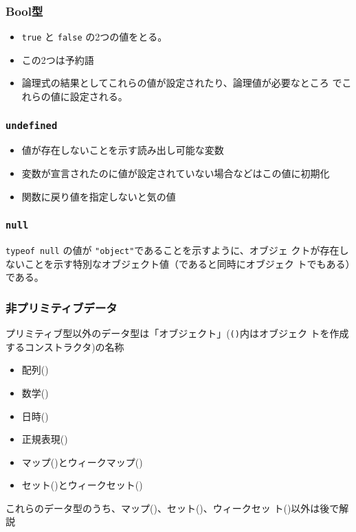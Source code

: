 \begin{frame}[containsverbatim]
 \frametitle{Bool型}
 \begin{itemize}
  \item \Verb+true+ と \Verb+false+ の2つの値をとる。
  \item この2つは予約語
  \item 論理式の結果としてこれらの値が設定されたり、論理値が必要なところ
        でこれらの値に設定される。
 \end{itemize}
\end{frame}
\begin{frame}[containsverbatim]
 \frametitle{\texttt{undefined}}
 \begin{itemize}
  \item 値が存在しないことを示す読み出し可能な変数
  \item 変数が宣言されたのに値が設定されていない場合などはこの値に初期化
  \item 関数に戻り値を指定しないと気の値
 \end{itemize}
\end{frame}
\begin{frame}[containsverbatim]
 \frametitle{\texttt{null}}
\Verb+typeof null+ の値が \Verb+"object"+であることを示すように、オブジェ
クトが存在しないことを示す特別なオブジェクト値（であると同時にオブジェク
トでもある）である。
\end{frame}
\begin{frame}[containsverbatim]
\frametitle{非プリミティブデータ}
プリミティブ型以外のデータ型は「オブジェクト」(\texttt{()}内はオブジェク
トを作成するコンストラクタ)の名称
\begin{itemize}
 \item 配列()
 \item 数学()
 \item 日時()
 \item 正規表現()
 \item マップ()とウィークマップ()
 \item セット()とウィークセット()
\end{itemize}
 これらのデータ型のうち、マップ()、セット()、ウィークセッ
 ト()以外は後で解説
\end{frame}
